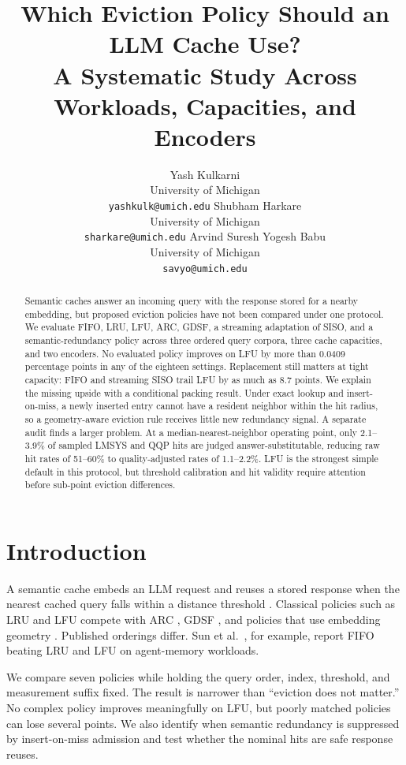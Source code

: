 \documentclass{article}
\title{Which Eviction Policy Should an LLM Cache Use?\\
A Systematic Study Across Workloads, Capacities, and Encoders}
\author{%
  Yash Kulkarni \\
  University of Michigan\\
  \texttt{yashkulk@umich.edu}
  \And
  Shubham Harkare \\
  University of Michigan\\
  \texttt{sharkare@umich.edu}
  \And
  Arvind Suresh Yogesh Babu \\
  University of Michigan\\
  \texttt{savyo@umich.edu}
}
\begin{document}
\maketitle

\begin{abstract}
Semantic caches answer an incoming query with the response stored for a nearby
embedding, but proposed eviction policies have not been compared under one
protocol. We evaluate FIFO, LRU, LFU, ARC, GDSF, a streaming adaptation of
SISO, and a semantic-redundancy policy across three ordered query corpora,
three cache capacities, and two encoders. No evaluated policy improves on LFU
by more than 0.0409 percentage points in any of the eighteen settings.
Replacement still matters at tight capacity: FIFO and streaming SISO trail LFU
by as much as 8.7 points. We explain the missing upside with a conditional
packing result. Under exact lookup and insert-on-miss, a newly inserted entry
cannot have a resident neighbor within the hit radius, so a geometry-aware
eviction rule receives little new redundancy signal. A separate audit finds a
larger problem. At a median-nearest-neighbor operating point, only 2.1--3.9\%
of sampled LMSYS and QQP hits are judged answer-substitutable, reducing raw
hit rates of 51--60\% to quality-adjusted rates of 1.1--2.2\%. LFU is the
strongest simple default in this protocol, but threshold calibration and hit
validity require attention before sub-point eviction differences.
\end{abstract}

\section{Introduction}
A semantic cache embeds an LLM request and reuses a stored response when the
nearest cached query falls within a distance threshold
\citep{bang2023gptcache}. Classical policies such as LRU and LFU compete with
ARC \citep{megiddo2003arc}, GDSF \citep{cherkasova1998gdsf}, and policies that
use embedding geometry \citep{kim2025siso,liu2026semantic,sun2026solar}.
Published orderings differ. Sun et al.\ \citep{sun2026solar}, for example,
report FIFO beating LRU and LFU on agent-memory workloads.

We compare seven policies while holding the query order, index, threshold, and
measurement suffix fixed. The result is narrower than ``eviction does not
matter.'' No complex policy improves meaningfully on LFU, but poorly matched
policies can lose several points. We also identify when semantic redundancy is
suppressed by insert-on-miss admission and test whether the nominal hits are
safe response reuses.
\end{document}
